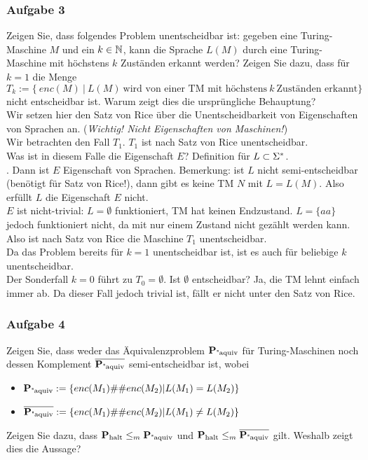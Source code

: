 \subsubsection*{Aufgabe 3}
    Zeigen Sie, dass folgendes Problem unentscheidbar ist: gegeben eine Turing-Maschine $M$ und ein $k \in \mathbb{N}$, kann die Sprache $L(M)$ durch eine Turing-Maschine mit höchstens $k$ Zuständen erkannt werden?
    Zeigen Sie dazu, dass für $k = 1$ die Menge $T_{k} := \{\ enc(M)\ |\ L(M)\ \text{wird von einer TM mit höchstens}\ k\ \text{Zuständen erkannt} \}$ nicht entscheidbar ist. Warum zeigt dies die ursprüngliche Behauptung? \\

    \LOES Wir setzen hier den Satz von Rice über die Unentscheidbarkeit von Eigenschaften von Sprachen an. (\textit{Wichtig! Nicht Eigenschaften von Maschinen!}) \\
    Wir betrachten den Fall $T_{1}$. $T_{1}$ ist nach Satz von Rice unentscheidbar. \\
    Was ist in diesem Falle die Eigenschaft $E$? Definition für $L \subset \Sigma^{*}$. \\
    . Dann ist $E$ Eigenschaft von Sprachen. Bemerkung: ist $L$ nicht semi-entscheidbar (benötigt für Satz von Rice!), dann gibt es keine TM $N$  mit $L = L(M)$. Also erfüllt $L$ die Eigenschaft $E$ nicht. \\
    $E$ ist nicht-trivial: $L = \emptyset$ funktioniert, TM hat keinen Endzustand. $L = \{ aa \}$ jedoch funktioniert nicht, da mit nur einem Zustand nicht gezählt werden kann.
    Also ist nach Satz von Rice die Maschine $T_{1}$ unentscheidbar. \\
    Da das Problem bereits für $k=1$ unentscheidbar ist, ist es auch für beliebige $k$ unentscheidbar. \\
    Der Sonderfall $k=0$ führt zu $T_{0} = \emptyset$. Ist $\emptyset$ entscheidbar? Ja, die TM lehnt einfach immer ab. Da dieser Fall jedoch trivial ist, fällt er nicht unter den Satz von Rice.

\newpage
\subsubsection*{Aufgabe 4}
\label{U4-4}
    Zeigen Sie, dass weder das Äquivalenzproblem $\textbf{P}_{\text{"aquiv}}$ für Turing-Maschinen noch dessen Komplement $\overline{\textbf{P}_{\text{"aquiv}}}$ semi-entscheidbar ist, wobei
    \begin{itemize}
        \item $\textbf{P}_{\text{"aquiv}} := \{ enc(M_{1}) \#\# enc(M_{2}) | L(M_{1}) = L(M_{2}) \}$
        \item $\overline{\textbf{P}_{\text{"aquiv}}} := \{ enc(M_{1}) \#\# enc(M_{2}) | L(M_{1}) \neq L(M_{2}) \}$
    \end{itemize}
    Zeigen Sie dazu, dass $\textbf{P}_{\text{halt}} \leq_{m} \textbf{P}_{\text{"aquiv}}$ und $\textbf{P}_{\text{halt}} \leq_{m} \overline{\textbf{P}_{\text{"aquiv}}}$ gilt. Weshalb zeigt dies die Aussage? \\


